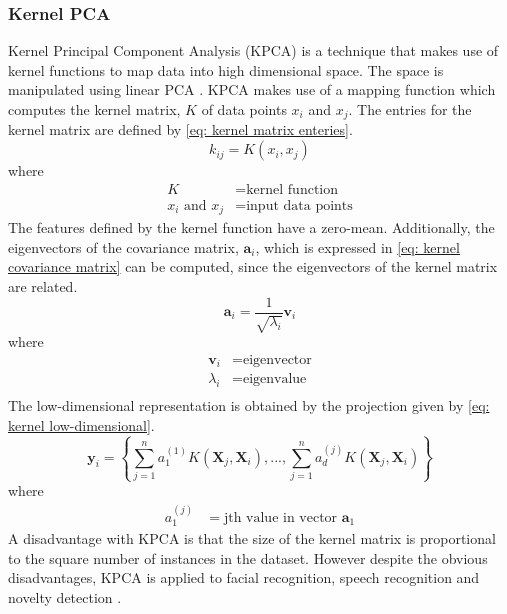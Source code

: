 \documentclass[11pt]{article}
\begin{document}
	\subsubsection{Kernel PCA}
	Kernel Principal Component Analysis (KPCA) is a technique that makes use of kernel functions to map data into high dimensional space. The space is manipulated using linear PCA \cite{Cui2012}. KPCA makes use of a mapping function which computes the kernel matrix, $K$ of data points $x_i$ and $x_j$. The entries for the kernel matrix are defined by \eqref{eq: kernel matrix enteries}.
	\begin{equation}
		k_{ij} = K(x_i, x_j)
		\label{eq: kernel matrix enteries}
	\end{equation}
	where
	\begin{align*}
		K &= \text{kernel function}\\
		x_i \text{ and } x_j &= \text{input data points}
	\end{align*}
	The features defined by the kernel function have a zero-mean. Additionally, the eigenvectors of the covariance matrix, $\textbf{a}_i$, which is expressed in \eqref{eq: kernel covariance matrix} can be computed, since the eigenvectors of the kernel matrix are related. 
	\begin{equation}
		\textbf{a}_i = \frac{1}{\sqrt{\lambda_i}} \textbf{v}_i
		\label{eq: kernel covariance matrix}
	\end{equation}
	where
	\begin{align*}
		\textbf{v}_i &= \text{eigenvector} \\
		\lambda_i &= \text{eigenvalue}\\
	\end{align*}
	The low-dimensional representation is obtained by the projection given by \eqref{eq: kernel low-dimensional}.
	\begin{equation}
		\textbf{y}_i = \left\{ \sum_{j = 1}^{n}a_1^{(1)}K(\textbf{X}_j, \textbf{X}_i), ... , \sum_{j = 1}^{n}a_d^{(j)}K(\textbf{X}_j, \textbf{X}_i) \right\}
		\label{eq: kernel low-dimensional}
	\end{equation}
	where
	\begin{align*}
		a_1^{(j)} &= \text{jth value in vector }\textbf{a}_1
	\end{align*}
	A disadvantage with KPCA is that the size of the kernel matrix is proportional to the square number of instances in the dataset. However despite the obvious disadvantages, KPCA is applied to facial recognition, speech recognition and novelty detection \cite{van2009dimensionality}.
	
\end{document}

